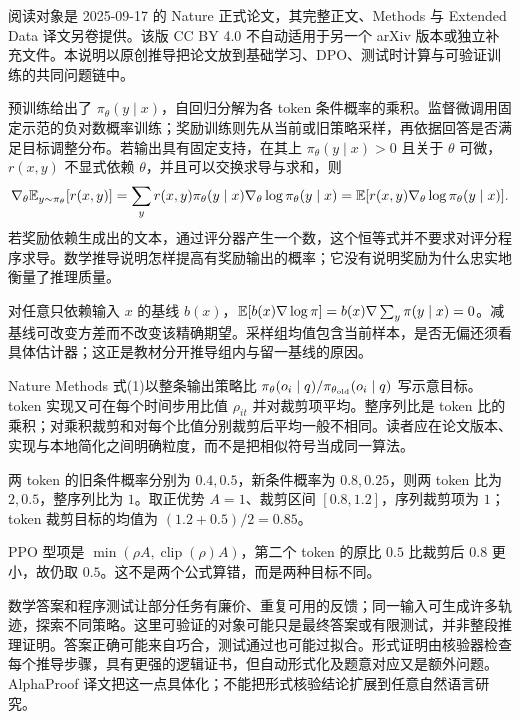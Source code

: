 \label{study:r1}
\noindent 阅读对象是 2025-09-17 的 Nature 正式论文\cite{r1nature}，其完整正文、Methods 与 Extended Data 译文另卷提供。该版 CC BY 4.0 不自动适用于另一个 arXiv 版本或独立补充文件。本说明以原创推导把论文放到基础学习、DPO、测试时计算与可验证训练的共同问题链中。

预训练给出了 $\pi_\theta(y\mid x)$，自回归分解为各 token 条件概率的乘积。监督微调用固定示范的负对数概率训练；奖励训练则先从当前或旧策略采样，再依据回答是否满足目标调整分布。若输出具有固定支持，在其上 $\pi_\theta(y\mid x)>0$ 且关于 $\theta$ 可微，$r(x,y)$ 不显式依赖 $\theta$，并且可以交换求导与求和，则
\[
\nabla_\theta\mathbb E_{y\sim\pi_\theta}[r(x,y)]
=\sum_y r(x,y)\pi_\theta(y\mid x)\nabla_\theta\log\pi_\theta(y\mid x)
=\mathbb E[r(x,y)\nabla_\theta\log\pi_\theta(y\mid x)].
\]
若奖励依赖生成出的文本，通过评分器产生一个数，这个恒等式并不要求对评分程序求导。数学推导说明怎样提高有奖励输出的概率；它没有说明奖励为什么忠实地衡量了推理质量。

对任意只依赖输入 $x$ 的基线 $b(x)$，$\mathbb E[b(x)\nabla\log\pi]=b(x)\nabla\sum_y\pi(y\mid x)=0$。减基线可改变方差而不改变该精确期望。采样组均值包含当前样本，是否无偏还须看具体估计器；这正是教材分开推导组内与留一基线的原因。

Nature Methods 式(1)以整条输出策略比 $\pi_\theta(o_i\mid q)/\pi_{\theta_{\rm old}}(o_i\mid q)$ 写示意目标。token 实现又可在每个时间步用比值 $\rho_{it}$ 并对裁剪项平均。整序列比是 token 比的乘积；对乘积裁剪和对每个比值分别裁剪后平均一般不相同。读者应在论文版本、实现与本地简化之间明确粒度，而不是把相似符号当成同一算法。

\begin{example}
两 token 的旧条件概率分别为 $0.4,0.5$，新条件概率为 $0.8,0.25$，则两 token 比为 $2,0.5$，整序列比为 $1$。取正优势 $A=1$、裁剪区间 $[0.8,1.2]$，序列裁剪项为 $1$；token 裁剪目标的均值为 $(1.2+0.5)/2=0.85$。
\end{example}
\begin{solution}
PPO 型项是 $\min(\rho A,\operatorname{clip}(\rho)A)$，第二个 token 的原比 $0.5$ 比裁剪后 $0.8$ 更小，故仍取 $0.5$。这不是两个公式算错，而是两种目标不同。
\end{solution}

数学答案和程序测试让部分任务有廉价、重复可用的反馈；同一输入可生成许多轨迹，探索不同策略。这里可验证的对象可能只是最终答案或有限测试，并非整段推理证明。答案正确可能来自巧合，测试通过也可能过拟合。形式证明由核验器检查每个推导步骤，具有更强的逻辑证书，但自动形式化及题意对应又是额外问题。AlphaProof 译文把这一点具体化；不能把形式核验结论扩展到任意自然语言研究。

